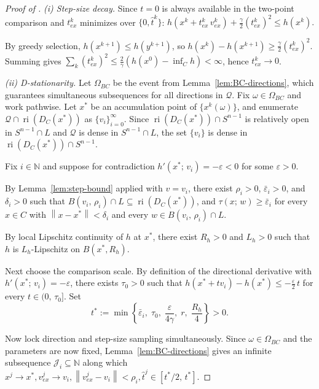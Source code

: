 \documentclass[10pt,a4paper]{amsart}
\newcommand{\N}{\mathbb{N}}
\newcommand{\norm}[1]{\left\|#1\right\|}
\DeclareMathOperator{\ri}{ri}
\begin{document}
\begin{proof}[Proof of ]
\textit{(i) Step-size decay.} Since $t = 0$ is always available in the two-point comparison and $t^k_{ex}$ minimizes over $\{0, \hat{t}^k\}$:
  $h\!\left(x^k + t^k_{ex}\,v^k_{ex}\right) + \tfrac{\gamma}{2}(t^k_{ex})^2 \leq h(x^k).$
  
By greedy selection, $h(x^{k+1}) \leq h(y^{k+1})$, so $h(x^k) - h(x^{k+1}) \geq \frac{\gamma}{2}(t^k_{ex})^2$. Summing gives $\sum_k (t^k_{ex})^2 \leq \frac{2}{\gamma}(h(x^0) - \inf_C h) < \infty$, hence $t^k_{ex} \to 0$.

\textit{(ii) D-stationarity.} Let $\Omega_{BC}$ be the event from Lemma~\ref{lem:BC-directions}, which guarantees simultaneous subsequences for all directions in $\mathcal{Q}$. Fix $\omega \in \Omega_{BC}$ and work pathwise. Let $x^*$ be an accumulation point of $\{x^k(\omega)\}$, and enumerate $\mathcal{Q}\cap \ri(D_C(x^*))$ as $\{v_i\}_{i=0}^{\infty}$. Since $\ri(D_C(x^*))\cap S^{n-1}$ is relatively open in $S^{n-1}\cap L$ and $\mathcal{Q}$ is dense in $S^{n-1}\cap L$, the set $\{v_i\}$ is dense in $\ri(D_C(x^*))\cap S^{n-1}$.

Fix $i \in \N$ and suppose for contradiction $h'(x^*;\, v_i) = -\varepsilon < 0$ for some $\varepsilon > 0$.



By Lemma~\ref{lem:step-bound} applied with $v = v_i$, there exist $\rho_i > 0$, $\bar{\varepsilon}_i > 0$, and $\delta_i > 0$ such that $B(v_i,\, \rho_i) \cap L \subseteq \ri(D_C(x^*))$, and $\tau(x;\, w) \geq \bar{\varepsilon}_i$ for every $x \in C$ with $\norm{x - x^*} < \delta_i$ and every $w \in B(v_i,\, \rho_i) \cap L$.



By local Lipschitz continuity of $h$ at $x^*$, there exist $R_h>0$ and $L_h>0$ such that $h$ is $L_h$-Lipschitz on $B(x^*,R_h)$.

Next choose the comparison scale. By definition of the directional derivative with $h'(x^*;\, v_i) = -\varepsilon$, there exists $\tau_0 > 0$ such that $h(x^* + t v_i) - h(x^*) \leq -\tfrac{\varepsilon}{2}\,t$ for every $t \in (0,\, \tau_0]$. Set
\[
  t^* := \min\!\left\{\bar{\varepsilon}_i,\;\tau_0,\;\frac{\varepsilon}{4\gamma},\;r,\;\frac{R_h}{4}\right\} > 0.
\]



Now lock direction and step-size sampling simultaneously. Since $\omega \in \Omega_{BC}$ and the parameters are now fixed, Lemma~\ref{lem:BC-directions} gives an infinite subsequence $\mathcal{J}_i \subseteq \N$ along which $x^j \to x^*,  v^j_{ex} \to v_i,  \norm{v^j_{ex} - v_i} < \rho_i,  \hat{t}^j \in [t^*/2,\, t^*].$


\end{proof}
\end{document}

